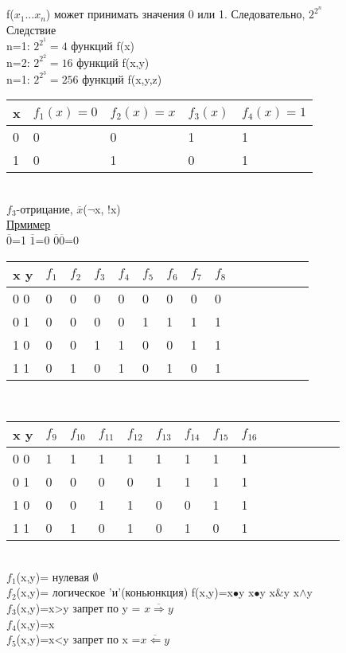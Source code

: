 \documentclass{article}
\begin{document}
f($x_1$...$x_n$) может принимать значения 0 или 1. Следовательно, $2^{2^n}$\\
Следствие\\
n=1: $2^{2^1}=4$ функций f(x)\\
n=2: $2^{2^2}=16$ функций f(x,y)\\
n=1: $2^{2^3}=256$ функций f(x,y,z)\\
\begin{tabular}{l|l|l|l|l}
x&$f_1(x)=0$&$f_2(x)=x$&$f_3(x)$&$f_4(x)=1$\\
\hline
0& 0        &0 &1&1\\
1& 0        &1 &0&1
\end{tabular}\\
$f_3$-отрицание, $\overline{x}$($\neg$x, !x)\\
\underline{Прмимер}\\
$\overline{0}$=1 \quad $\overline{1}$=0 \quad $\overline{0}{\overline{0}}$=0\\
\begin{tabular}{l|l|l|l|l|l|l|l|l|l|l|l|l|l|l}
x y&$f_1$&$f_2$&$f_3$&$f_4$&$f_5$&$f_6$&$f_7$&$f_8$\\
\hline
0 0 &0 &0 &0 &0 &0 &0 &0 &0\\
0 1 &0 &0 &0 &0 &1 &1 &1 &1\\
1 0 &0 &0 &1 &1 &0 &0 &1 &1\\
1 1 &0 &1 &0 &1 &0 &1 &0 &1\\
\end{tabular}\\
\begin{tabular}{l|l|l|l|l|l|l|l|l|l|l|l|l|l|l}
x y&$f_9$&$f_{10}$&$f_{11}$&$f_{12}$&$f_{13}$&$f_{14}$&$f_{15}$&$f_{16}$\\
\hline
0 0 &1 &1 &1 &1 &1 &1 &1 &1\\
0 1 &0 &0 &0 &0 &1 &1 &1 &1\\
1 0 &0 &0 &1 &1 &0 &0 &1 &1\\
1 1 &0 &1 &0 &1 &0 &1 &0 &1\\
\end{tabular}\\
$f_1$(x,y)= нулевая $\emptyset$\\
$f_2$(x,y)= логическое 'и'(коньюнкция) f(x,y)=x$\bullet$y x$\bullet$y x\&y x$\wedge$y\\
$f_3$(x,y)=x>y запрет по y = $\overline{x\Rightarrow y}$\\
$f_4$(x,y)=x\\
$f_5$(x,y)=x<y запрет по x =$\overline{x\Leftarrow y}$\\
\end{document}
